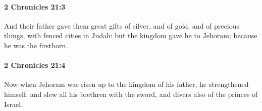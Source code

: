 		\paragraph{2 Chronicles 21:3} %
			\label{2CHRONICLES-21-3}

			And their father gave them great gifts of silver, and of gold, and of precious things, with fenced cities in Judah: but the kingdom gave he to Jehoram; because he was the firstborn.


		\paragraph{2 Chronicles 21:4} %
			\label{2CHRONICLES-21-4}

			Now when Jehoram was risen up to the kingdom of his father, he strengthened himself, and slew all his brethren with the sword, and divers also of the princes of Israel.

